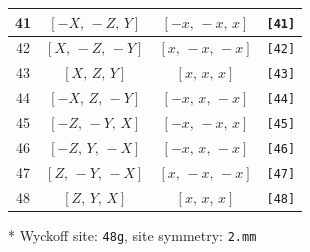 \documentclass[fleqn,8pt]{jsarticle}
\begin{document}
\begin{longtable}{cccc}
41 & $\left[ - X,\, - Z,\, Y \right]$ & $\left[ - x,\, - x,\, x \right]$ & {\tt [41]} \\ \hline
42 & $\left[ X,\, - Z,\, - Y \right]$ & $\left[ x,\, - x,\, - x \right]$ & {\tt [42]} \\ \hline
43 & $\left[ X,\, Z,\, Y \right]$ & $\left[ x,\, x,\, x \right]$ & {\tt [43]} \\ \hline
44 & $\left[ - X,\, Z,\, - Y \right]$ & $\left[ - x,\, x,\, - x \right]$ & {\tt [44]} \\ \hline
45 & $\left[ - Z,\, - Y,\, X \right]$ & $\left[ - x,\, - x,\, x \right]$ & {\tt [45]} \\ \hline
46 & $\left[ - Z,\, Y,\, - X \right]$ & $\left[ - x,\, x,\, - x \right]$ & {\tt [46]} \\ \hline
47 & $\left[ Z,\, - Y,\, - X \right]$ & $\left[ x,\, - x,\, - x \right]$ & {\tt [47]} \\ \hline
48 & $\left[ Z,\, Y,\, X \right]$ & $\left[ x,\, x,\, x \right]$ & {\tt [48]} \\
\end{longtable}
* Wyckoff site: {\tt 48g}, site symmetry: {\tt 2.mm}
\renewcommand{\arraystretch}{1.2}
\end{document}
